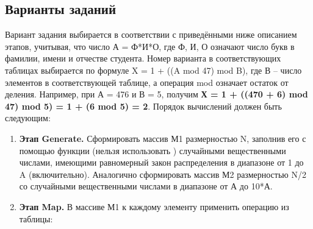 \subsection{Варианты заданий}

Вариант задания выбирается в соответствии с приведёнными ниже описанием этапов, учитывая, что число А = Ф*И*О, где Ф, И, О означают число букв в фамилии, имени и отчестве студента. Номер варианта в соответствующих таблицах выбирается по формуле X = 1 + ((A mod 47) mod B), где В -- число элементов в соответствующей таблице, а операция mod означает остаток от деления. Например, при А = 476 и В = 5, получим \textbf{Х = 1 + ((470 + 6) mod 47) mod 5) = 1 + (6 mod 5) = 2}. Порядок вычислений должен быть следующим:

\begin{enumerate}
    \item\textbf{Этап Generate.} Сформировать массив М1 размерностью N, заполнив его с помощью функции  (нельзя использовать ) случайными вещественными числами, имеющими равномерный закон распределения в диапазоне от 1 до A (включительно). Аналогично сформировать массив М2 размерностью N/2 со случайными вещественными числами в диапазоне от А до 10*А.
    \item\textbf{Этап Map.} В массиве М1 к каждому элементу применить операцию из таблицы:

    

\end{enumerate}
